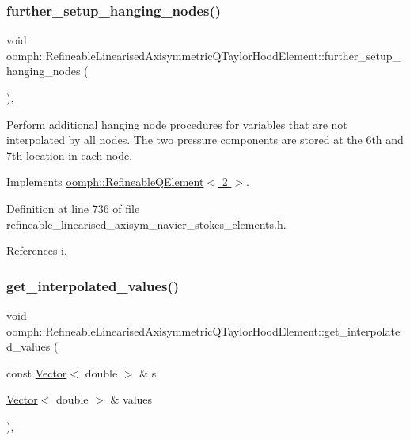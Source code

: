 \subsubsection{\texorpdfstring{further\+\_\+setup\+\_\+hanging\+\_\+nodes()}{further\_setup\_hanging\_nodes()}}
{\footnotesize\ttfamily void oomph\+::\+Refineable\+Linearised\+Axisymmetric\+Q\+Taylor\+Hood\+Element\+::further\+\_\+setup\+\_\+hanging\+\_\+nodes (\begin{DoxyParamCaption}{ }\end{DoxyParamCaption})\hspace{0.3cm}{\ttfamily [inline]}, {\ttfamily [virtual]}}



Perform additional hanging node procedures for variables that are not interpolated by all nodes. The two pressure components are stored at the 6th and 7th location in each node. 



Implements \hyperlink{classoomph_1_1RefineableQElement_3_012_01_4_a01e1eb063dd2c98ebb42d87959ca6b88}{oomph\+::\+Refineable\+Q\+Element$<$ 2 $>$}.



Definition at line 736 of file refineable\+\_\+linearised\+\_\+axisym\+\_\+navier\+\_\+stokes\+\_\+elements.\+h.



References i.

\mbox{\label{classoomph_1_1RefineableLinearisedAxisymmetricQTaylorHoodElement_ae8da06a515c2a06e4dcf96b00480d229}} 
\subsubsection{\texorpdfstring{get\+\_\+interpolated\+\_\+values()}{get\_interpolated\_values()}\hspace{0.1cm}{\footnotesize\ttfamily [1/2]}}
{\footnotesize\ttfamily void oomph\+::\+Refineable\+Linearised\+Axisymmetric\+Q\+Taylor\+Hood\+Element\+::get\+\_\+interpolated\+\_\+values (\begin{DoxyParamCaption}\item[{const \hyperlink{classoomph_1_1Vector}{Vector}$<$ double $>$ \&}]{s,  }\item[{\hyperlink{classoomph_1_1Vector}{Vector}$<$ double $>$ \&}]{values }\end{DoxyParamCaption})\hspace{0.3cm}{\ttfamily [inline]}, {\ttfamily [virtual]}}



